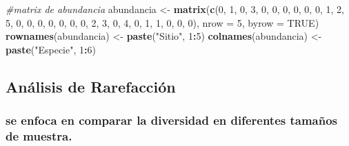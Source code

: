 \documentclass[
]{article}
\newenvironment{Shaded}{\begin{snugshade}}{\end{snugshade}}
\newcommand{\AttributeTok}[1]{\textcolor[rgb]{0.13,0.29,0.53}{#1}}
\newcommand{\CommentTok}[1]{\textcolor[rgb]{0.56,0.35,0.01}{\textit{#1}}}
\newcommand{\ConstantTok}[1]{\textcolor[rgb]{0.56,0.35,0.01}{#1}}
\newcommand{\DecValTok}[1]{\textcolor[rgb]{0.00,0.00,0.81}{#1}}
\newcommand{\FunctionTok}[1]{\textcolor[rgb]{0.13,0.29,0.53}{\textbf{#1}}}
\newcommand{\NormalTok}[1]{#1}
\newcommand{\OtherTok}[1]{\textcolor[rgb]{0.56,0.35,0.01}{#1}}
\newcommand{\SpecialCharTok}[1]{\textcolor[rgb]{0.81,0.36,0.00}{\textbf{#1}}}
\newcommand{\StringTok}[1]{\textcolor[rgb]{0.31,0.60,0.02}{#1}}
\begin{document}
\begin{Shaded}
\begin{Highlighting}[]
\CommentTok{\#matrix de abundancia}
\NormalTok{abundancia }\OtherTok{\textless{}{-}} \FunctionTok{matrix}\NormalTok{(}\FunctionTok{c}\NormalTok{(}\DecValTok{0}\NormalTok{, }\DecValTok{1}\NormalTok{, }\DecValTok{0}\NormalTok{, }\DecValTok{3}\NormalTok{, }\DecValTok{0}\NormalTok{, }\DecValTok{0}\NormalTok{,}
                       \DecValTok{0}\NormalTok{, }\DecValTok{0}\NormalTok{, }\DecValTok{0}\NormalTok{, }\DecValTok{0}\NormalTok{, }\DecValTok{1}\NormalTok{, }\DecValTok{2}\NormalTok{,}
                       \DecValTok{5}\NormalTok{, }\DecValTok{0}\NormalTok{, }\DecValTok{0}\NormalTok{, }\DecValTok{0}\NormalTok{, }\DecValTok{0}\NormalTok{, }\DecValTok{0}\NormalTok{,}
                       \DecValTok{0}\NormalTok{, }\DecValTok{0}\NormalTok{, }\DecValTok{2}\NormalTok{, }\DecValTok{3}\NormalTok{, }\DecValTok{0}\NormalTok{, }\DecValTok{4}\NormalTok{,}
                       \DecValTok{0}\NormalTok{, }\DecValTok{1}\NormalTok{, }\DecValTok{1}\NormalTok{, }\DecValTok{0}\NormalTok{, }\DecValTok{0}\NormalTok{, }\DecValTok{0}\NormalTok{), }
                     \AttributeTok{nrow =} \DecValTok{5}\NormalTok{, }\AttributeTok{byrow =} \ConstantTok{TRUE}\NormalTok{)}
\FunctionTok{rownames}\NormalTok{(abundancia) }\OtherTok{\textless{}{-}} \FunctionTok{paste}\NormalTok{(}\StringTok{"Sitio"}\NormalTok{, }\DecValTok{1}\SpecialCharTok{:}\DecValTok{5}\NormalTok{)}
\FunctionTok{colnames}\NormalTok{(abundancia) }\OtherTok{\textless{}{-}} \FunctionTok{paste}\NormalTok{(}\StringTok{"Especie"}\NormalTok{, }\DecValTok{1}\SpecialCharTok{:}\DecValTok{6}\NormalTok{)}
\end{Highlighting}
\end{Shaded}

\hypertarget{anuxe1lisis-de-rarefacciuxf3n}{%
\subsection{Análisis de
Rarefacción}\label{anuxe1lisis-de-rarefacciuxf3n}}

\hypertarget{se-enfoca-en-comparar-la-diversidad-en-diferentes-tamauxf1os-de-muestra.}{%
\subsubsection{se enfoca en comparar la diversidad en diferentes tamaños
de
muestra.}\label{se-enfoca-en-comparar-la-diversidad-en-diferentes-tamauxf1os-de-muestra.}}
\end{document}

